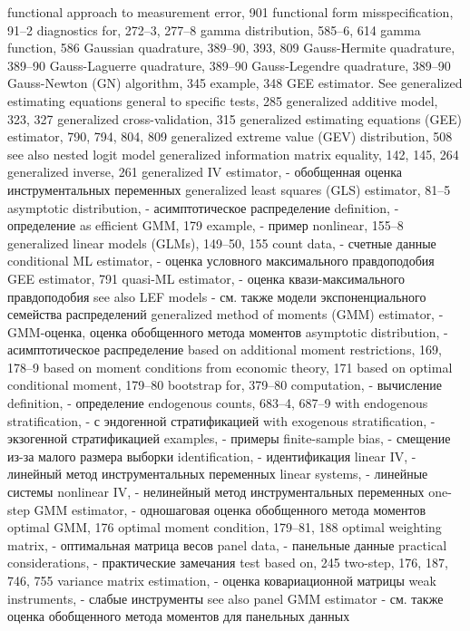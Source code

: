functional approach
to measurement error, 901
functional form misspecification, 91–2 diagnostics for, 272–3, 277–8
gamma distribution, 585–6, 614 gamma function, 586
Gaussian quadrature, 389–90, 393, 809 Gauss-Hermite quadrature, 389–90 Gauss-Laguerre quadrature, 389–90 Gauss-Legendre quadrature, 389–90
Gauss-Newton (GN) algorithm, 345 example, 348
GEE estimator. See generalized estimating equations general to specific tests, 285
generalized additive model, 323, 327
generalized cross-validation, 315
generalized estimating equations (GEE) estimator, 790, 794, 804, 809
generalized extreme value (GEV) distribution, 508 see also nested logit model
generalized information matrix equality, 142, 145, 264 generalized inverse, 261
generalized IV estimator, - обобщенная оценка инструментальных переменных
generalized least squares (GLS) estimator, 81–5
asymptotic distribution, - асимптотическое распределение 
definition, - определение
as efficient GMM, 179 
example, - пример
nonlinear, 155–8
generalized linear models (GLMs), 149–50, 155
count data, - счетные данные
conditional ML estimator, - оценка условного максимального правдоподобия 
GEE estimator, 791
quasi-ML estimator, - оценка квази-максимального правдоподобия 
see also LEF models - см. также модели экспоненциального семейства распределений
generalized method of moments (GMM) estimator, - GMM-оценка, оценка обобщенного метода моментов
asymptotic distribution, - асимптотическое распределение
based on additional moment restrictions, 169,
178–9
based on moment conditions from economic theory,
171
based on optimal conditional moment, 179–80 bootstrap for, 379–80
computation, - вычисление
definition, - определение
endogenous counts, 683–4, 687–9
with endogenous stratification, - с эндогенной стратификацией
with exogenous stratification, - экзогенной стратификацией
examples, - примеры
finite-sample bias, - смещение из-за малого размера выборки
identification, - идентификация
linear IV, - линейный метод инструментальных переменных
linear systems, - линейные системы
nonlinear IV, - нелинейный метод инструментальных переменных
one-step GMM estimator, - одношаговая оценка обобщенного метода моментов 
optimal GMM, 176
optimal moment condition, 179–81, 188 
optimal weighting matrix, - оптимальная матрица весов
panel data, - панельные данные
practical considerations, - практические замечания
test based on, 245
two-step, 176, 187, 746, 755
variance matrix estimation, - оценка ковариационной матрицы
weak instruments, - слабые инструменты
see also panel GMM estimator - см. также оценка обобщенного метода моментов для панельных данных

